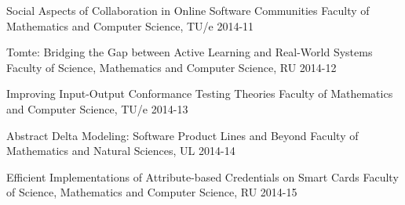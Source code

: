 \begin{multicols}{2}
         {Social Aspects of Collaboration in Online Software Communities}
         {Faculty of Mathematics and Computer Science, TU/e}
         {2014-11}

         {Tomte: Bridging the Gap between Active Learning and Real-World Systems}
         {Faculty of Science, Mathematics and Computer Science, RU}
         {2014-12}

         {Improving Input-Output Conformance Testing Theories}
         {Faculty of Mathematics and Computer Science, TU/e}
         {2014-13}

         {Abstract Delta Modeling: Software Product Lines and Beyond}
         {Faculty of Mathematics and Natural Sciences, UL}
         {2014-14}

         {Efficient Implementations of Attribute-based Credentials on Smart Cards}
         {Faculty of Science, Mathematics and Computer Science, RU}
         {2014-15}



\end{multicols}

